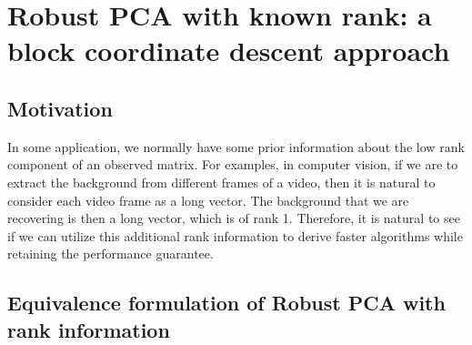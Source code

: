 \section{Robust PCA with known rank: a block coordinate descent approach}

\subsection{Motivation}
In some application, we normally have some prior information about the low rank component of an observed matrix. For examples, in computer vision, if we are to extract the background from different frames of a video, then it is natural to consider each video frame as a long vector. The background that we are recovering is then a long vector, which is of rank 1. Therefore, it is natural to see if we can utilize this additional rank information to derive faster algorithms while retaining the performance guarantee.



\subsection{Equivalence formulation of Robust PCA with rank information}

